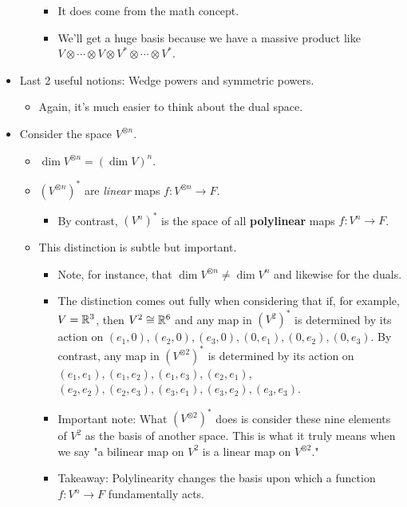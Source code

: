 \documentclass[../notes.tex]{subfiles}
\begin{document}
\begin{itemize}
\begin{itemize}
        \begin{itemize}
            \item It does come from the math concept.
            \item We'll get a huge basis because we have a massive product like $V\otimes\cdots\otimes V\otimes V^*\otimes\cdots\otimes V^*$.
        \end{itemize}
    \end{itemize}
    \item Last 2 useful notions: Wedge powers and symmetric powers.
    \begin{itemize}
        \item Again, it's much easier to think about the dual space.
    \end{itemize}
    \item Consider the space $V^{\otimes n}$.
    \begin{itemize}
        \item $\dim V^{\otimes n}=(\dim V)^n$.
        \item $(V^{\otimes n})^*$ are \emph{linear} maps $f:V^{\otimes n}\to F$.
        \begin{itemize}
            \item By contrast, $(V^n)^*$ is the space of all \textbf{polylinear} maps $f:V^n\to F$.
        \end{itemize}
        \item This distinction is subtle but important. 
        \begin{itemize}
            \item Note, for instance, that $\dim V^{\otimes n}\neq\dim V^n$ and likewise for the duals.
            \item The distinction comes out fully when considering that if, for example, $V=\mathbb{R}^3$, then $V^2\cong\mathbb{R}^6$ and any map in $(V^2)^*$ is determined by its action on $(e_1,0),(e_2,0),(e_3,0),(0,e_1),(0,e_2),(0,e_3)$. By contrast, any map in $(V^{\otimes 2})^*$ is determined by its action on $(e_1,e_1),(e_1,e_2),(e_1,e_3),(e_2,e_1)$, $(e_2,e_2),(e_2,e_3),(e_3,e_1),(e_3,e_2),(e_3,e_3)$.
            \item Important note: What $(V^{\otimes 2})^*$ does is consider these nine elements of $V^2$ as the basis of another space. This is what it truly means when we say "a bilinear map on $V^2$ is a linear map on $V^{\otimes 2}$."
            \item Takeaway: Polylinearity changes the basis upon which a function $f:V^n\to F$ fundamentally acts.
        \end{itemize}

\end{itemize}
\end{itemize}
\end{document}
